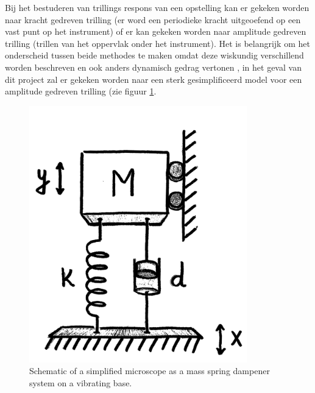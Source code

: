 \documentclass[11pt]{article}
\begin{document}
Bij het bestuderen van trillings respons van een opstelling kan er gekeken worden naar kracht gedreven trilling (er word een periodieke kracht uitgeoefend op een vast punt op het instrument) of er kan gekeken worden naar amplitude gedreven trilling (trillen van het oppervlak onder het instrument).
Het is belangrijk om het onderscheid tussen beide methodes te maken omdat deze wiskundig verschillend worden beschreven en ook anders dynamisch gedrag vertonen \citep{hesselberthBasicCalculationsVibration2015}, in het geval van dit project zal er gekeken worden naar een sterk gesimplificeerd model voor een amplitude gedreven trilling (zie figuur \ref{fig:1DOFoscilator}.

\begin{figure}[H]
  \centering
  \begin{minipage}[b]{0.30\textwidth}
    \includegraphics[width=\textwidth]{img/resonance/simplified_1DOF_oscilator.png}
    \caption{Schematic of a simplified microscope as a mass spring dampener system on a vibrating base. \citep{hesselberthMicroscopieBeweging}}
    \label{fig:1DOFoscilator}
  \end{minipage}
  \hfill

\end{figure}
\end{document}
